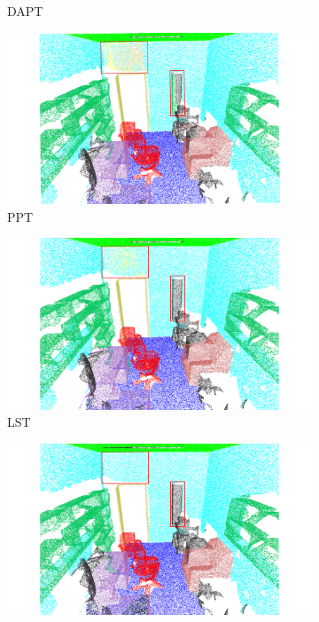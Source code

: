 \begin{figure}
\begin{subfigure}{0.235\textwidth}
        \caption{DAPT}
        \label{fig:s3dis3}
    \end{subfigure}
    \hfill
    \begin{subfigure}{0.235\textwidth}
        \centering
        \includegraphics[width=\linewidth]{fig/S3DIS/PPT.pdf}
        \caption{PPT}
        \label{fig:s3dis4}
    \end{subfigure}
    \hfill
    \begin{subfigure}{0.235\textwidth}
        \centering
        \includegraphics[width=\linewidth]{fig/S3DIS/PLT.pdf}
        \caption{LST}
        \label{fig:s3dis5}
    \end{subfigure}
    \hfill
    \begin{subfigure}{0.235\textwidth}
        \centering
        \includegraphics[width=\linewidth]{fig/S3DIS/GT.pdf}

\end{subfigure}
\end{figure}
